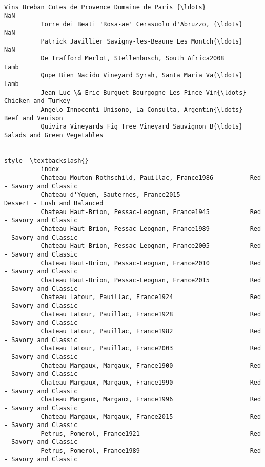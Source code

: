 \documentclass[11pt]{article}
\begin{document}
\begin{Verbatim}[commandchars=\\\{\}]
          Vins Breban Cotes de Provence Domaine de Paris {\ldots}                           NaN   
          Torre dei Beati 'Rosa-ae' Cerasuolo d'Abruzzo, {\ldots}                           NaN   
          Patrick Javillier Savigny-les-Beaune Les Montch{\ldots}                           NaN   
          De Trafford Merlot, Stellenbosch, South Africa2008                          Lamb   
          Qupe Bien Nacido Vineyard Syrah, Santa Maria Va{\ldots}                          Lamb   
          Jean-Luc \& Eric Burguet Bourgogne Les Pince Vin{\ldots}            Chicken and Turkey   
          Angelo Innocenti Unisono, La Consulta, Argentin{\ldots}              Beef and Venison   
          Quivira Vineyards Fig Tree Vineyard Sauvignon B{\ldots}   Salads and Green Vegetables   
          
                                                                                      style  \textbackslash{}
          index                                                                               
          Chateau Mouton Rothschild, Pauillac, France1986          Red - Savory and Classic   
          Chateau d'Yquem, Sauternes, France2015                Dessert - Lush and Balanced   
          Chateau Haut-Brion, Pessac-Leognan, France1945           Red - Savory and Classic   
          Chateau Haut-Brion, Pessac-Leognan, France1989           Red - Savory and Classic   
          Chateau Haut-Brion, Pessac-Leognan, France2005           Red - Savory and Classic   
          Chateau Haut-Brion, Pessac-Leognan, France2010           Red - Savory and Classic   
          Chateau Haut-Brion, Pessac-Leognan, France2015           Red - Savory and Classic   
          Chateau Latour, Pauillac, France1924                     Red - Savory and Classic   
          Chateau Latour, Pauillac, France1928                     Red - Savory and Classic   
          Chateau Latour, Pauillac, France1982                     Red - Savory and Classic   
          Chateau Latour, Pauillac, France2003                     Red - Savory and Classic   
          Chateau Margaux, Margaux, France1900                     Red - Savory and Classic   
          Chateau Margaux, Margaux, France1990                     Red - Savory and Classic   
          Chateau Margaux, Margaux, France1996                     Red - Savory and Classic   
          Chateau Margaux, Margaux, France2015                     Red - Savory and Classic   
          Petrus, Pomerol, France1921                              Red - Savory and Classic   
          Petrus, Pomerol, France1989                              Red - Savory and Classic   

\end{Verbatim}
\end{document}
